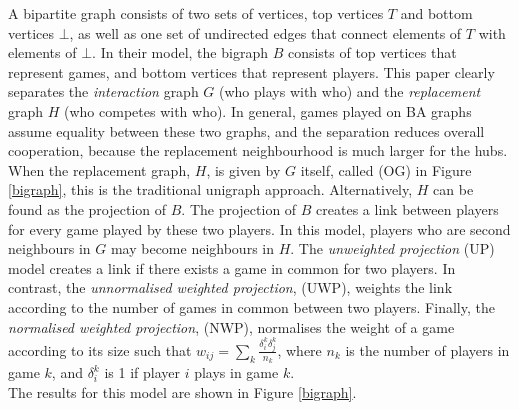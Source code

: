  
 A bipartite graph consists of two sets of vertices, top vertices $T$ and bottom vertices $\bot$, as well as one set of undirected edges that connect elements of $T$ with elements of $\bot$. In their model, the bigraph $B$ consists of top vertices that represent games, and bottom vertices that represent players. This paper clearly separates the \emph{interaction} graph $G$ (who plays with who) and the \emph{replacement} graph $H$ (who competes with who). In general, games played on BA graphs assume equality between these two graphs, and the separation reduces overall cooperation, because the replacement neighbourhood is much larger for the hubs.  \\
 
When the replacement graph, $H$, is given by $G$ itself, called (OG) in Figure \ref{bigraph}, this is the traditional unigraph approach. Alternatively, $H$ can be found as the projection of $B$. The projection of $B$ creates a link between players for every game played by these two players. In this model, players who are second neighbours in $G$ may become neighbours in $H$. The \emph{unweighted projection} (UP) model creates a link if there exists a game in common for two players. In contrast, the \emph{unnormalised weighted projection}, (UWP), weights the link according to the number of games in common between two players. Finally, the \emph{normalised weighted projection}, (NWP), normalises the weight of a game according to its size such that $w_{ij} = \sum_k \frac{\delta_i^k\delta_j^k}{n_k}$, where $n_k$ is the number of players in game $k$, and $\delta_i^k$ is 1 if player $i$ plays in game $k$. \\

The results for this model are shown in Figure \ref{bigraph}. \\

 
 
 
 
 
